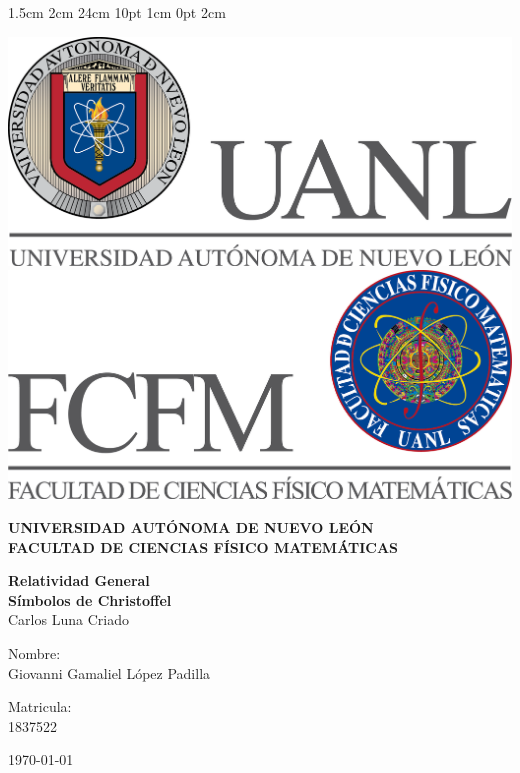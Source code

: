 \documentclass[12pt,letterpaper]{report}
\begin{document}
\setmargins{2.5cm}      
{1.5cm}                     
{2cm}  
{24cm}                    
{10pt}                          
{1cm}                          
{0pt}                             
{2cm}
\begin{titlepage}
\begin{center}
\includegraphics[scale=0.40]{../../Logos/uanl.png} 
\hspace{2.5cm}
\includegraphics[scale=0.40]{../../Logos/fcfm.png}
\end{center}
\vspace{2cm}
\begin{center}
\textbf{
UNIVERSIDAD AUTÓNOMA DE NUEVO LEÓN\\
FACULTAD DE CIENCIAS
    FÍSICO MATEMÁTICAS}\\
\vspace*{2cm}
\begin{large}
\vspace{1cm}
\large{\textbf{Relatividad General}}\\
\textbf{Símbolos de Christoffel}\\
Carlos Luna Criado\\
\end{large}
\vspace{3.5cm}
\begin{minipage}{0.6\linewidth}
\vspace{0.5cm}
\changefontsizes{14pt}
Nombre:\\
Giovanni Gamaliel López Padilla\\
\end{minipage}
\begin{minipage}{0.2\linewidth}
\changefontsizes{14pt}
Matricula:\\
1837522
\end{minipage}
\end{center}
\vspace{4cm}
\begin{flushright}
\today
\end{flushright}
\end{titlepage}
\end{document}
